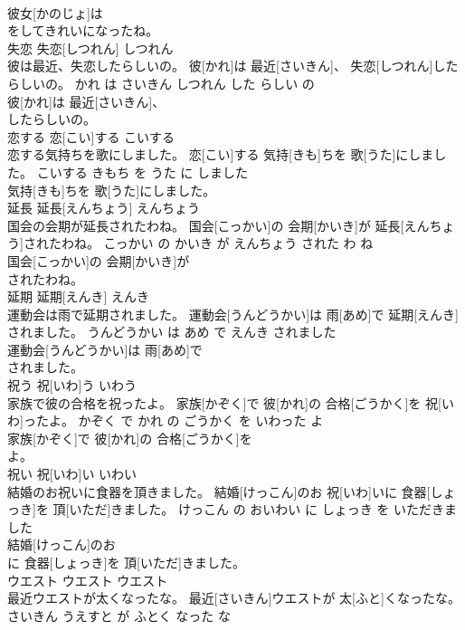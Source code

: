 \documentclass[8pt]{extreport}
\begin{document}
\begin{CJK}{UTF8}{min}
\\	彼女[かのじょ]は
\\	をしてきれいになったね。			
\\	失恋	失恋[しつれん]	しつれん	
\\	彼は最近、失恋したらしいの。	彼[かれ]は 最近[さいきん]、 失恋[しつれん]したらしいの。	かれ は さいきん しつれん した らしい の	
\\	彼[かれ]は 最近[さいきん]、
\\	したらしいの。			
\\	恋する	恋[こい]する	こいする	
\\	恋する気持ちを歌にしました。	恋[こい]する 気持[きも]ちを 歌[うた]にしました。	こいする きもち を うた に しました	
\\	気持[きも]ちを 歌[うた]にしました。			
\\	延長	延長[えんちょう]	えんちょう	
\\	国会の会期が延長されたわね。	国会[こっかい]の 会期[かいき]が 延長[えんちょう]されたわね。	こっかい の かいき が えんちょう された わ ね	
\\	国会[こっかい]の 会期[かいき]が
\\	されたわね。			
\\	延期	延期[えんき]	えんき	
\\	運動会は雨で延期されました。	運動会[うんどうかい]は 雨[あめ]で 延期[えんき]されました。	うんどうかい は あめ で えんき されました	
\\	運動会[うんどうかい]は 雨[あめ]で
\\	されました。			
\\	祝う	祝[いわ]う	いわう	
\\	家族で彼の合格を祝ったよ。	家族[かぞく]で 彼[かれ]の 合格[ごうかく]を 祝[いわ]ったよ。	かぞく で かれ の ごうかく を いわった よ	
\\	家族[かぞく]で 彼[かれ]の 合格[ごうかく]を
\\	よ。			
\\	祝い	祝[いわ]い	いわい	
\\	結婚のお祝いに食器を頂きました。	結婚[けっこん]のお 祝[いわ]いに 食器[しょっき]を 頂[いただ]きました。	けっこん の おいわい に しょっき を いただきました	
\\	結婚[けっこん]のお
\\	に 食器[しょっき]を 頂[いただ]きました。			
\\	ウエスト	ウエスト	ウエスト	
\\	最近ウエストが太くなったな。	最近[さいきん]ウエストが 太[ふと]くなったな。	さいきん うえすと が ふとく なった な	

\end{CJK}
\end{document}
